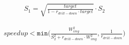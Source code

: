 \begin{align}
\label{eqn:s1}
S_1 = \sqrt{\frac{\mathit{target}}{1 - r_{\mathit{drill}-\mathit{down}} \cdot \mathit{target}}} \cdot S_2
\end{align}

\vspace{-2mm}
\begin{align}
\label{eqn:speedup_bound}
\mathit{speedup} < \texttt{min}\Bigg(\frac{W^2_\mathit{img}}{S^2_2+r_{\mathit{drill}-\mathit{down}} \cdot W^2_{img}}, \frac{1}{r_{\mathit{drill}-\mathit{down}}}\Bigg)
\end{align}



